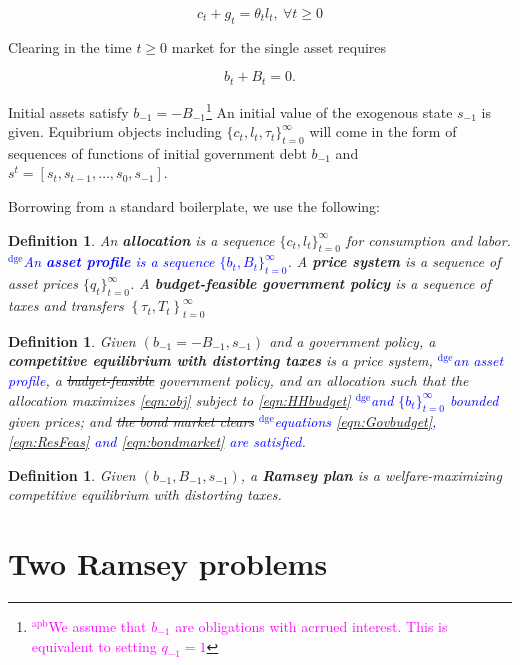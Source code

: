 \documentclass[12pt]{article}
\newcommand{\dge}[1]{\textcolor{blue}{$^{\textrm{dge}}${#1}}}
\newcommand{\apb}[1]{\textcolor{magenta}{$^{\textrm{apb}}${#1}}}
\newtheorem{definition}[theorem]{Definition}
\begin{document}
\begin{equation}
 \label{eqn:ResFeas}
 c_{t}+g_t = \theta _{t} l_{t}, \ \forall t \geq 0
 \end{equation}

 Clearing in the time $t \geq 0$ market for the single asset requires

 
\begin{equation}
 \label{eqn:bondmarket}
 b_{t}+B_{t}=0.
 \end{equation}

 Initial assets satisfy $b_{-1}=-B_{-1}$\footnote{\apb{We assume that $b_{-1}$ are obligations with acrrued interest. This is equivalent to setting $q_{-1}=1$}} An initial value of the exogenous state  $s_{-1}$ is given.
Equibrium objects including $\{c_t, l_t, \tau_t\}_{t=0}^\infty$ will come in the form of sequences of functions of  initial government debt  $b_{-1}$ and  $s^t = [s_t, s_{t-1}, \ldots, s_0, s_{-1}]$.


Borrowing from a standard boilerplate, we use the following:

\begin{definition}
An \textbf{allocation} is a sequence $\{c_t,l_t\}_{t=0}^\infty$ for consumption and labor. \dge{An \textbf{asset profile}  is a sequence $\{b_t,B_t\}_{t=0}^\infty$}. A \textbf{price system} is a sequence of asset prices $\{q_t\}_{t=0}^\infty$.  A \textbf{budget-feasible government policy} is a sequence of taxes and transfers $\left\{ \tau _{t},T_{t}\right\} _{t=0}^{\infty }$
\end{definition}

\begin{definition}
Given  $\left(b_{-1}=-B_{-1},s_{-1}\right) $ and a government policy,  a \textbf{competitive equilibrium
with distorting taxes} is a price system, \dge{an asset profile}, a \st{budget-feasible} government policy, and an allocation such that
the allocation maximizes \eqref{eqn:obj} subject to \eqref{eqn:HHbudget} \dge{and $\{b_{t}\}_{t=0}^\infty$ bounded}  given prices; and \st{the bond  market clears} \dge{equations \eqref{eqn:Govbudget}, \eqref{eqn:ResFeas} and \eqref{eqn:bondmarket} are satisfied}.
\end{definition}

\begin{definition}
Given $\left( b_{-1},B_{-1},s_{-1}\right) $, a \textbf{Ramsey plan} is a welfare-maximizing competitive
equilibrium with distorting taxes.
\end{definition}


\section{Two Ramsey problems}
\end{document}
